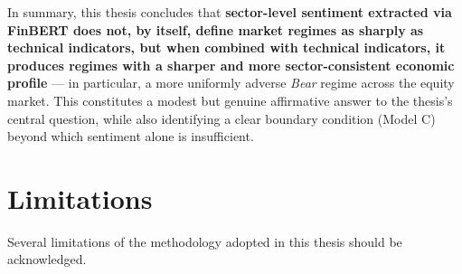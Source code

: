In summary, this thesis concludes that \textbf{sector-level sentiment
extracted via FinBERT does not, by itself, define market regimes as
sharply as technical indicators, but when combined with technical
indicators, it produces regimes with a sharper and more
sector-consistent economic profile} --- in particular, a more uniformly
adverse \emph{Bear} regime across the equity market. This constitutes a
modest but genuine affirmative answer to the thesis's central question,
while also identifying a clear boundary condition (Model C) beyond which
sentiment alone is insufficient.

\section{Limitations}
\label{sec:concl-limitations}

Several limitations of the methodology adopted in this thesis should be
acknowledged.

